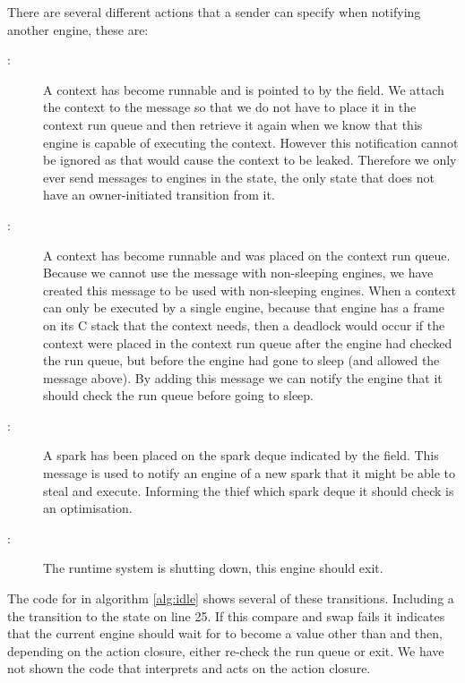 There are several different actions that a sender can specify when notifying
another engine,
these are:

\begin{description}

    \item[:]
    A context has become runnable and is pointed to by the
     field.
    We attach the context to the message so that we do not have to place it
    in the context run queue and then retrieve it again when we know that
    this engine is capable of executing the context.
    However this notification cannot be ignored as that would cause the
    context to be leaked.
    Therefore we only ever send  messages to engines in
    the  state,
    the only state that does not have an owner-initiated transition from 
    it.

    \item[:]
    A context has become runnable and was placed on the context run queue.
    Because we cannot use the  message with
    non-sleeping engines,
    we have created this message to be used with non-sleeping engines.
    When a context can only be executed by a single engine,
    because that engine has a frame on its C stack that the context needs,
    then a deadlock would occur if the context were placed in the context run
    queue after the engine had checked the run queue,
    but before the engine had gone to sleep (and allowed the message above).
    By adding this message we can notify the engine that it should check the
    run queue before going to sleep.

    \item[:]
    A spark has been placed on the spark deque indicated by the
     field.
    This message is used to notify an engine of a new spark that it might be
    able to steal and execute.
    Informing the thief which spark deque it should check is an
    optimisation.

    \item[:]
    The runtime system is shutting down, this engine should exit.

\end{description}

\noindent
{}
The code for \idle in algorithm \ref{alg:idle} shows several of these
transitions.
Including a the transition to the  state on line 25.
If this compare and swap fails it indicates that the current engine should 
wait for  to become a value other than  and then,
depending on the action closure,
either re-check the run queue or exit.
We have not shown the code that interprets and acts on the action closure.

